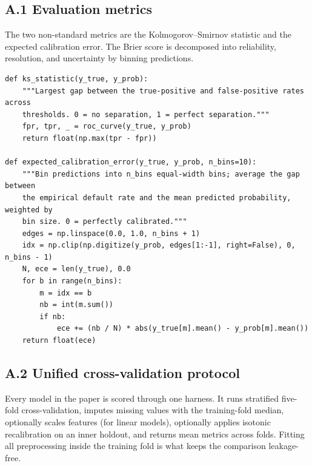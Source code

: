 \documentclass[12pt,a4paper]{article}
\begin{document}
\medskip

\subsection*{A.1 Evaluation metrics}

The two non-standard metrics are the Kolmogorov--Smirnov statistic and the
expected calibration error. The Brier score is decomposed into reliability,
resolution, and uncertainty by binning predictions.

\begin{lstlisting}[style=python]
def ks_statistic(y_true, y_prob):
    """Largest gap between the true-positive and false-positive rates across
    thresholds. 0 = no separation, 1 = perfect separation."""
    fpr, tpr, _ = roc_curve(y_true, y_prob)
    return float(np.max(tpr - fpr))

def expected_calibration_error(y_true, y_prob, n_bins=10):
    """Bin predictions into n_bins equal-width bins; average the gap between
    the empirical default rate and the mean predicted probability, weighted by
    bin size. 0 = perfectly calibrated."""
    edges = np.linspace(0.0, 1.0, n_bins + 1)
    idx = np.clip(np.digitize(y_prob, edges[1:-1], right=False), 0, n_bins - 1)
    N, ece = len(y_true), 0.0
    for b in range(n_bins):
        m = idx == b
        nb = int(m.sum())
        if nb:
            ece += (nb / N) * abs(y_true[m].mean() - y_prob[m].mean())
    return float(ece)
\end{lstlisting}

\subsection*{A.2 Unified cross-validation protocol}

Every model in the paper is scored through one harness. It runs stratified
five-fold cross-validation, imputes missing values with the training-fold
median, optionally scales features (for linear models), optionally applies
isotonic recalibration on an inner holdout, and returns mean metrics across
folds. Fitting all preprocessing inside the training fold is what keeps the
comparison leakage-free.
\end{document}
